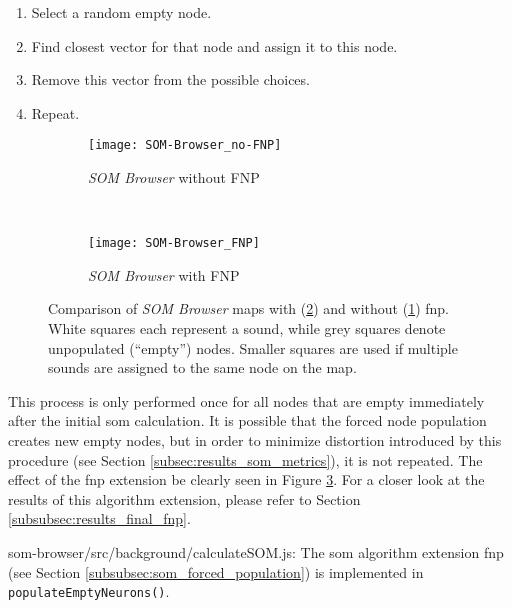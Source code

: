 \begin{enumerate}
  \item Select a random empty node.
  \item Find closest vector for that node and assign it to this node.
  \item Remove this vector from the possible choices.
  \item Repeat.
\end{enumerate}

\begin{figure}[!htb]
  \centering
\begin{subfigure}{0.45\textwidth}
  \centering
  \texttt{[image: SOM-Browser\_no-FNP]}
  \caption{\textit{SOM Browser} without FNP}
  \label{fig:som-browser_no_fnp}
\end{subfigure}
~
\begin{subfigure}{0.45\textwidth}
  \centering
  \texttt{[image: SOM-Browser\_FNP]}
  \caption{\textit{SOM Browser} with FNP}
  \label{fig:som-browser_fnp}
\end{subfigure}
\caption[Comparison of maps with (\ref{fig:som-browser_fnp}) and without
(\ref{fig:som-browser_no_fnp}) \gls{fnp}]
{Comparison of \textit{SOM Browser} maps with (\ref{fig:som-browser_fnp}) and
without (\ref{fig:som-browser_no_fnp}) \gls{fnp}. White squares each represent
a sound, while grey squares denote unpopulated (``empty'') nodes. Smaller
squares are used if multiple sounds are assigned to the same node on the map.}
\label{fig:som-browser_fnp_comparison}
\end{figure}

This process is only performed once for all nodes that are empty immediately
after the initial \gls{som} calculation. It is possible that the forced node
population creates new empty nodes, but in order to minimize distortion
introduced by this procedure (see Section \ref{subsec:results_som_metrics}), it
is not repeated. The effect of the \gls{fnp} extension be clearly seen in Figure
\ref{fig:som-browser_fnp_comparison}. For a closer look at the results of this
algorithm extension, please refer to Section \ref{subsubsec:results_final_fnp}.

\begin{listing}[!htb]
  \caption[FNP implementation]{som-browser/src/background/calculateSOM.js:
  The \gls{som} algorithm extension \gls{fnp} (see Section
  \ref{subsubsec:som_forced_population}) is implemented in
  \texttt{populateEmptyNeurons()}.}
  \label{lst:som-browser_fnp}
\end{listing}
